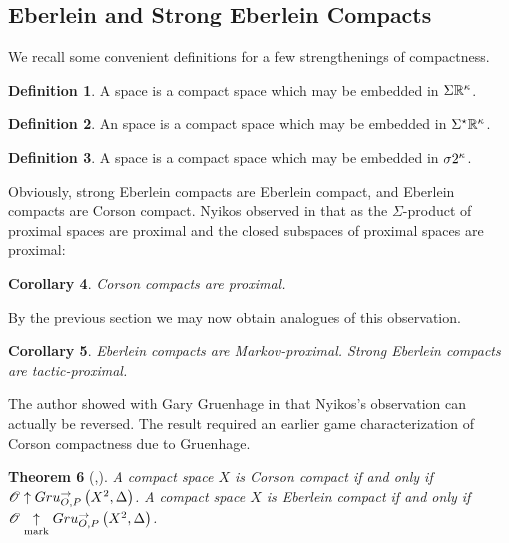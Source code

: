 \documentclass{amsart}
\newtheorem{theorem}{Theorem}[section]
\newtheorem{corollary}[theorem]{Corollary}
\theoremstyle{definition}
\newtheorem{definition}[theorem]{Definition}
\begin{document}
\subsection{Eberlein and Strong Eberlein Compacts}

  We recall some convenient definitions for a few strengthenings of
  compactness.

  \begin{definition}
    A  space is a compact space which may be embedded in
    \(\Sigma\mathbb{R}^{\kappa}\).
  \end{definition}

  \begin{definition}
    An  space is a compact space which may be embedded
    in \(\Sigma^\star\mathbb{R}^{\kappa}\).
  \end{definition}

  \begin{definition}
    A  space is a compact space which may
    be embedded in \(\sigma2^{\kappa}\).
  \end{definition}

  Obviously, strong Eberlein compacts are Eberlein compact, and Eberlein
  compacts are Corson compact. Nyikos observed in
  \cite{MR3288115} that as the \(\Sigma\)-product of proximal spaces
  are proximal and the closed subspaces of proximal spaces are proximal:

  \begin{corollary}
    Corson compacts are proximal.
  \end{corollary}

  By the previous section we may now obtain analogues of this observation.

  \begin{corollary}
    Eberlein compacts are Markov-proximal. Strong Eberlein compacts are
    tactic-proximal.
  \end{corollary}

  The author showed with Gary Gruenhage in \cite{MR3227201} that
  Nyikos's observation can actually be reversed. The result required an
  earlier game characterization of Corson compactness due to Gruenhage.

  \begin{theorem}[\cite{MR752278},\cite{MR858337}]
    A compact space \(X\) is Corson compact if and only if
    \(\mathscr{O}\uparrow Gru_{O,P}^{\to}\left({X^2},{\Delta}\right)\).
    A compact space \(X\) is Eberlein compact if and only if
    \(\mathscr{O}\underset{\text{mark}}{\uparrow}Gru_{O,P}^{\to}\left({X^2},{\Delta}\right)\).
  \end{theorem}
\end{document}
